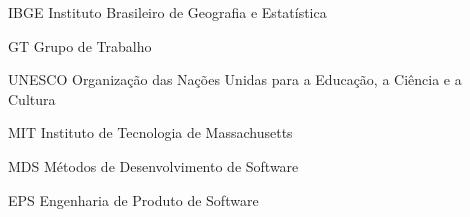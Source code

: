 \begin{siglas}
  \item[IBGE] Instituto Brasileiro de Geografia e Estatística
  \item[GT] Grupo de Trabalho
  \item[UNESCO] Organização das Nações Unidas para a Educação, a Ciência e a Cultura
  \item[MIT] Instituto de Tecnologia de Massachusetts
  \item[MDS] Métodos de Desenvolvimento de Software
  \item[EPS] Engenharia de Produto de Software
\end{siglas}
